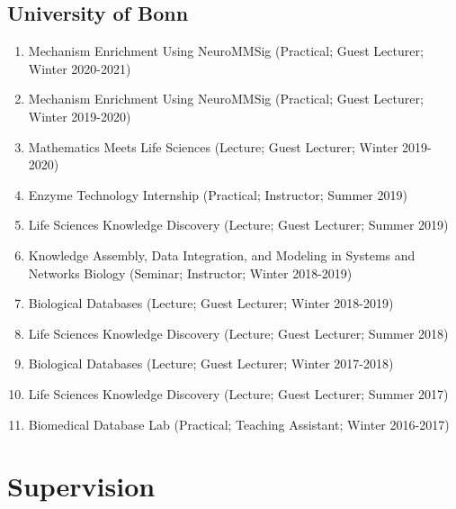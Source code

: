 \documentclass[10pt,a4paper,sans]{moderncv} %
\begin{document}
        \subsection{University of Bonn}
        \begin{enumerate}
        \item     Mechanism Enrichment Using NeuroMMSig (Practical; Guest Lecturer; Winter 2020-2021)

        \item     Mechanism Enrichment Using NeuroMMSig (Practical; Guest Lecturer; Winter 2019-2020)

        \item     Mathematics Meets Life Sciences (Lecture; Guest Lecturer; Winter 2019-2020)

        \item     Enzyme Technology Internship (Practical; Instructor; Summer 2019)

        \item     Life Sciences Knowledge Discovery (Lecture; Guest Lecturer; Summer 2019)

        \item     Knowledge Assembly, Data Integration, and Modeling in Systems and Networks Biology (Seminar; Instructor; Winter 2018-2019)

        \item     Biological Databases (Lecture; Guest Lecturer; Winter 2018-2019)

        \item     Life Sciences Knowledge Discovery (Lecture; Guest Lecturer; Summer 2018)

        \item     Biological Databases (Lecture; Guest Lecturer; Winter 2017-2018)

        \item     Life Sciences Knowledge Discovery (Lecture; Guest Lecturer; Summer 2017)

        \item     Biomedical Database Lab (Practical; Teaching Assistant; Winter 2016-2017)

        \end{enumerate}

    \section{Supervision}
\end{document}
